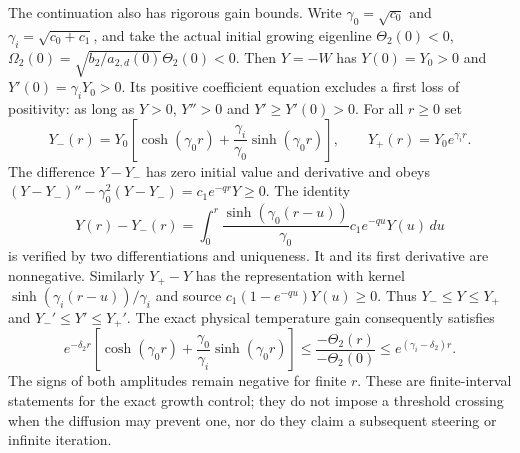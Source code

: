 \documentclass[11pt]{article}
\begin{document}
The continuation also has rigorous gain bounds. Write
$\gamma_0=\sqrt{c_0}$ and $\gamma_i=\sqrt{c_0+c_1}$, and take
the actual initial growing eigenline
$\Theta_2(0)<0$, $\Omega_2(0)=\sqrt{b_2/a_{2,d}(0)}\Theta_2(0)<0$.
Then $Y=-W$ has $Y(0)=Y_0>0$ and $Y'(0)=\gamma_iY_0>0$.
Its positive coefficient equation excludes a first loss of positivity:
as long as $Y>0$, $Y''>0$ and $Y'\geq Y'(0)>0$.
For all $r\geq0$ set
\[
 Y_-(r)=Y_0\left[\cosh(\gamma_0r)
                  +\frac{\gamma_i}{\gamma_0}\sinh(\gamma_0r)\right],
 \qquad Y_+(r)=Y_0e^{\gamma_ir}.
\]
The difference $Y-Y_-$ has zero initial value and derivative and obeys
$(Y-Y_-)''-\gamma_0^2(Y-Y_-)=c_1e^{-qr}Y\geq0$.
The identity
\[
 Y(r)-Y_-(r)=\int_0^r
 \frac{\sinh(\gamma_0(r-u))}{\gamma_0}
 c_1e^{-qu}Y(u)\,du
\]
is verified by two differentiations and uniqueness. It and its first
derivative are nonnegative. Similarly $Y_+-Y$ has the representation
with kernel $\sinh(\gamma_i(r-u))/\gamma_i$ and source
$c_1(1-e^{-qu})Y(u)\geq0$. Thus
$Y_-\leq Y\leq Y_+$ and $Y_-'\leq Y'\leq Y_+'$.
The exact physical temperature gain consequently satisfies
\[
 e^{-\delta_2r}\left[\cosh(\gamma_0r)
       +\frac{\gamma_0}{\gamma_i}\sinh(\gamma_0r)\right]
 \leq\frac{-\Theta_2(r)}{-\Theta_2(0)}
 \leq e^{(\gamma_i-\delta_2)r}.
\]
The signs of both amplitudes remain negative for finite $r$.
These are finite-interval statements for the exact growth control;
they do not impose a threshold crossing when the diffusion may prevent
one, nor do they claim a subsequent steering or infinite iteration.
\end{document}
